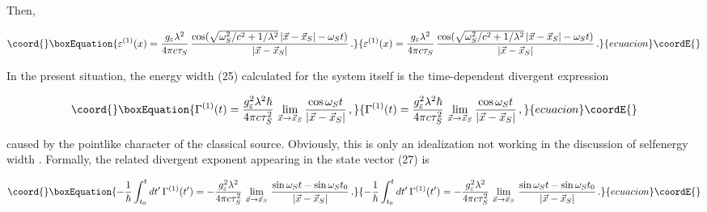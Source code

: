 \documentclass[a4paper,12pt]{article}
\begin{document}
\ni Then,

\begin{equation}\coord{}\boxEquation{
\varepsilon^{(1)} (x) =  \frac{g_\varepsilon \lambda^2}{4\pi c \tau_S}\, \frac{\cos(\sqrt{\omega^2_S/c^2 + 1/\lambda^2} \,|\vec{x} - \vec{x}_S| - \omega_S t)}{ |\vec{x} - \vec{x}_S|} \,.
}{
\varepsilon^{(1)} (x) =  \frac{g_\varepsilon \lambda^2}{4\pi c \tau_S}\, \frac{\cos(\sqrt{\omega^2_S/c^2 + 1/\lambda^2} \,|\vec{x} - \vec{x}_S| - \omega_S t)}{ |\vec{x} - \vec{x}_S|} \,.
}{ecuacion}\coordE{}\end{equation}

In the present situation, the energy width (25) calculated for the system itself is the time-dependent divergent expression

\begin{equation}\coord{}\boxEquation{
\Gamma^{(1)}(t) = \frac{g^2_\varepsilon \lambda^2 \hbar}{4\pi c \tau_S^2}\, \lim_{\vec{x} \rightarrow \vec{x}_S} \frac{\cos \omega_S t}{|\vec{x}-\vec{x}_S|} \,,
}{
\Gamma^{(1)}(t) = \frac{g^2_\varepsilon \lambda^2 \hbar}{4\pi c \tau_S^2}\, \lim_{\vec{x} \rightarrow \vec{x}_S} \frac{\cos \omega_S t}{|\vec{x}-\vec{x}_S|} \,,
}{ecuacion}\coordE{}\end{equation}

\ni caused by the pointlike character of the classical source. Obviously, this is only an idealization not working in the discussion of selfenergy width \coordHE{}. Formally, the related divergent exponent appearing in the state vector (27) is

\begin{equation}\coord{}\boxEquation{
-\frac{1}{\hbar} \int^t_{t_0} dt'\, \Gamma^{(1)}(t') = -\frac{g^2_\varepsilon \lambda^2}{4\pi c \tau_S^2}\, \lim_{\vec{x} \rightarrow \vec{x}_S}\, \frac{\sin \omega_S t - \sin \omega_S t_0}{|\vec{x}-\vec{x}_S|} \,.
}{
-\frac{1}{\hbar} \int^t_{t_0} dt'\, \Gamma^{(1)}(t') = -\frac{g^2_\varepsilon \lambda^2}{4\pi c \tau_S^2}\, \lim_{\vec{x} \rightarrow \vec{x}_S}\, \frac{\sin \omega_S t - \sin \omega_S t_0}{|\vec{x}-\vec{x}_S|} \,.
}{ecuacion}\coordE{}\end{equation}
\end{document}
